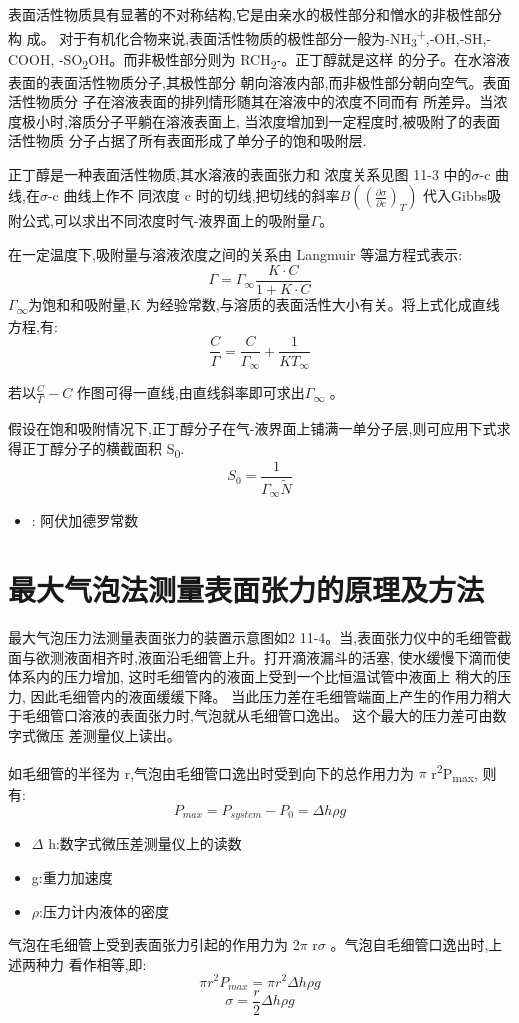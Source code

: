 \documentclass[11pt]{report}
\begin{document}
表面活性物质具有显著的不对称结构,它是由亲水的极性部分和憎水的非极性部分构
成。 对于有机化合物来说,表面活性物质的极性部分一般为-NH\textsubscript{3}\textsuperscript{+},-OH,-SH,-COOH,
-SO\textsubscript{2}OH。而非极性部分则为 RCH\textsubscript{2}-。正丁醇就是这样
的分子。在水溶液表面的表面活性物质分子,其极性部分
朝向溶液内部,而非极性部分朝向空气。表面活性物质分
子在溶液表面的排列情形随其在溶液中的浓度不同而有
所差异。当浓度极小时,溶质分子平躺在溶液表面上,
当浓度增加到一定程度时,被吸附了的表面活性物质
分子占据了所有表面形成了单分子的饱和吸附层.

正丁醇是一种表面活性物质,其水溶液的表面张力和
浓度关系见图 11-3 中的\(\sigma\)-c 曲线,在\(\sigma\)-c 曲线上作不
同浓度 c 时的切线,把切线的斜率\(B\left(\left(\frac{\partial \sigma}{\partial c}\right)_{T}\right)\)
代入Gibbs吸附公式,可以求出不同浓度时气-液界面上的吸附量\(\Gamma\)。

在一定温度下,吸附量与溶液浓度之间的关系由 Langmuir 等温方程式表示:
\[
\Gamma=\Gamma_{\infty}\frac{K\cdot C}{1+K\cdot C}
\]
\(\Gamma\)\textsubscript{\(\infty\)}为饱和和吸附量,K 为经验常数,与溶质的表面活性大小有关。将上式化成直线方程,有:
\[
\frac{C}{\Gamma}=\frac{C}{\Gamma_{\infty}}+\frac{1}{KT_{\infty}}
\]

若以\(\frac{C}{\Gamma}-C\) 作图可得一直线,由直线斜率即可求出\(\Gamma\)\textsubscript{\(\infty\)} 。

假设在饱和吸附情况下,正丁醇分子在气-液界面上铺满一单分子层,则可应用下式求得正丁醇分子的横截面积 S\textsubscript{0}.
\[
S_{0}=\frac{1}{\Gamma_{\infty}\widetilde{N}}
\]
\begin{itemize}
\item {}: 阿伏加德罗常数
\end{itemize}


\chapter{最大气泡法测量表面张力的原理及方法}
\label{sec:org5571713}
最大气泡压力法测量表面张力的装置示意图如2
11-4。当,表面张力仪中的毛细管截面与欲测液面相齐时,液面沿毛细管上升。打开滴液漏斗的活塞,
使水缓慢下滴而使体系内的压力增加, 这时毛细管内的液面上受到一个比恒温试管中液面上
稍大的压力, 因此毛细管内的液面缓缓下降。 当此压力差在毛细管端面上产生的作用力稍大
于毛细管口溶液的表面张力时,气泡就从毛细管口逸出。 这个最大的压力差可由数字式微压
差测量仪上读出。

如毛细管的半径为 r,气泡由毛细管口逸出时受到向下的总作用力为 \(\pi\) r\textsuperscript{2}P\textsubscript{max}, 则有:
\[
P_{max}=P_{system}-P_{0}=\Delta h\rho g
\]
\begin{itemize}
\item \(\Delta\) h:数字式微压差测量仪上的读数
\item g:重力加速度
\item \(\rho\):压力计内液体的密度
\end{itemize}
气泡在毛细管上受到表面张力引起的作用力为 2\(\pi\) r\(\sigma\) 。气泡自毛细管口逸出时,上述两种力
看作相等,即:
\[
\pi r^{2}P_{max}=\pi r^{2}\Delta h\rho g
\]
\[
\sigma=\frac{r}{2}\Delta h\rho g
\]
\end{document}
